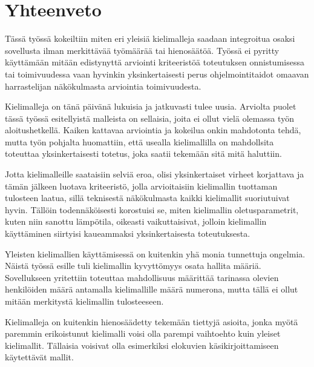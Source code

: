 \chapter{Yhteenveto}
\label{ch:yhteenveto}

Tässä työssä kokeiltiin miten eri yleisiä kielimalleja saadaan integroitua
osaksi sovellusta ilman merkittävää työmäärää tai hienosäätöä. Työssä ei
pyritty käyttämään mitään edistynyttä arviointi kriteeristöä toteutuksen
onnistumisessa tai toimivuudessa vaan hyvinkin yksinkertaisesti perus
ohjelmointitaidot omaavan harrastelijan näkökulmasta arviointia toimivuudesta.

Kielimalleja on tänä päivänä lukuisia ja jatkuvasti tulee uusia. Arviolta
puolet tässä työssä esitellyistä malleista on sellaisia, joita ei ollut vielä
olemassa työn aloitushetkellä. Kaiken kattavaa arviointia ja kokeilua onkin
mahdotonta tehdä, mutta työn pohjalta huomattiin, että usealla kielimallilla
on mahdollsita toteuttaa yksinkertaisesti totetus, joka saatii tekemään sitä
mitä haluttiin.

Jotta kielimalleille saataisiin selviä eroa, olisi yksinkertaiset virheet
korjattava ja tämän jälkeen luotava kriteeristö, jolla arvioitaisiin
kielimallin tuottaman tulosteen laatua, sillä teknisestä näkökulmasta
kaikki kielimallit suoriutuivat hyvin. Tällöin todennäköisesti korostuisi se,
miten kielimallin oletusparametrit, kuten niin sanottu lämpötila, oikeasti
vaikuttaisivat, jolloin kielimallin käyttäminen siirtyisi kaueammaksi
yksinkertaisesta toteutuksesta.

Yleisten kielimallien käyttämisessä on kuitenkin yhä monia tunnettuja ongelmia.
Näistä työssä esille tuli kielimallin kyvyttömyys osata hallita määriä.
Sovellukseen yritettiin toteuttaa mahdollisuus määrittää tarinassa olevien
henkilöiden määrä antamalla kielimallille määrä numerona, mutta tällä ei ollut
mitään merkitystä kielimallin tulosteeseen.

Kielimalleja on kuitenkin hienosäädetty tekemään tiettyjä asioita, jonka myötä
paremmin erikoistunut kielimalli voisi olla parempi vaihtoehto kuin yleiset
kielimallit. Tällaisia voisivat olla esimerkiksi elokuvien käsikirjoittamiseen
käytettävät mallit.
